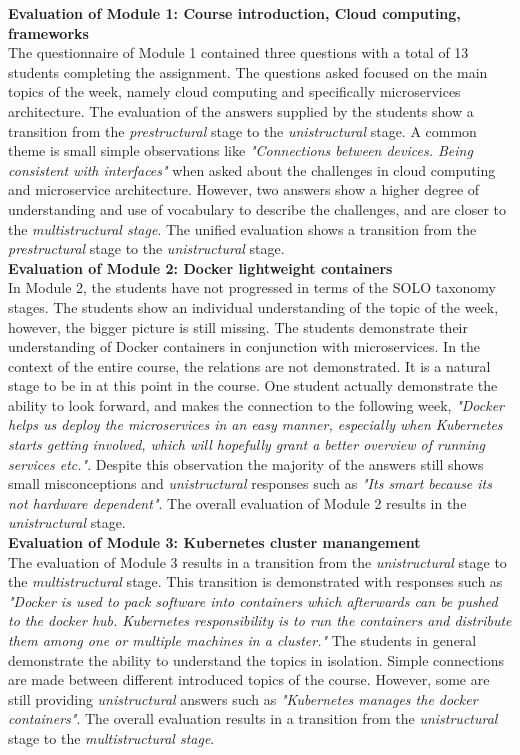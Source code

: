 \noindent\textbf{Evaluation of Module 1: Course introduction, Cloud computing, frameworks}\\ 
The questionnaire of Module 1 contained three questions with a total of 13 students completing the assignment. The questions asked focused on the main topics of the week, namely cloud computing and specifically microservices architecture. The evaluation of the answers supplied by the students show a transition from the \textit{prestructural} stage to the \textit{unistructural} stage. A common theme is small simple observations like \textit{"Connections between devices. Being consistent with interfaces"} when asked about the challenges in cloud computing and microservice architecture. However, two answers show a higher degree of understanding and use of vocabulary to describe the challenges, and are closer to the \textit{multistructural stage}. The unified evaluation shows a transition from the \textit{prestructural} stage to the \textit{unistructural} stage.  \\ 

\noindent\textbf{Evaluation of Module 2: Docker lightweight containers}\\ 
In Module 2, the students have not progressed in terms of the SOLO taxonomy stages. The students show an individual understanding of the topic of the week, however, the bigger picture is still missing. The students demonstrate their understanding of Docker containers in conjunction with microservices. In the context of the entire course, the relations are not demonstrated. It is a natural stage to be in at this point in the course. One student actually demonstrate the ability to look forward, and makes the connection to the following week, \textit{"Docker helps us deploy the microservices in an easy manner, especially when Kubernetes starts getting involved, which will hopefully grant a better overview of running services etc."}. Despite this observation the majority of the answers still shows small misconceptions and \textit{unistructural} responses such as \textit{"Its smart because its not hardware dependent"}. The overall evaluation of Module 2 results in the \textit{unistructural} stage. \\

\noindent\textbf{Evaluation of Module 3: Kubernetes cluster manangement}\\ 
The evaluation of Module 3 results in a transition from the \textit{unistructural} stage to the \textit{multistructural} stage. This transition is demonstrated with responses such as \textit{"Docker is used to pack software into containers which afterwards can be pushed to the docker hub. Kubernetes responsibility is to run the containers and distribute them among one or multiple machines in a cluster."} The students in general demonstrate the ability to understand the topics in isolation. Simple connections are made between different introduced topics of the course. However, some are still providing \textit{unistructural} answers such as \textit{"Kubernetes manages the docker containers"}. The overall evaluation results in a transition from the \textit{unistructural} stage to the \textit{multistructural stage}. \\

